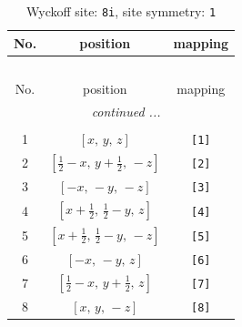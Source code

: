 \documentclass[fleqn,8pt]{jsarticle}
\begin{document}
\renewcommand{\arraystretch}{1.2}
\begin{longtable}{ccc}
\caption{Wyckoff site: {\tt 8i}, site symmetry: {\tt 1}}
 \\
 \hline \hline
No. & position & mapping \\ \hline \endfirsthead

\multicolumn{2}{l}{\tablename\ \thetable{}} \\
 \hline \hline
No. & position & mapping \\ \hline \endhead

 \hline \hline
\multicolumn{2}{r}{\footnotesize\it continued ...} \\ \endfoot

 \hline \hline
\multicolumn{2}{r}{} \\ \endlastfoot

1 & $\left[ x,\, y,\, z \right]$ & {\tt [1]} \\ \hline
2 & $\left[ \frac{1}{2} - x,\, y + \frac{1}{2},\, - z \right]$ & {\tt [2]} \\ \hline
3 & $\left[ - x,\, - y,\, - z \right]$ & {\tt [3]} \\ \hline
4 & $\left[ x + \frac{1}{2},\, \frac{1}{2} - y,\, z \right]$ & {\tt [4]} \\ \hline
5 & $\left[ x + \frac{1}{2},\, \frac{1}{2} - y,\, - z \right]$ & {\tt [5]} \\ \hline
6 & $\left[ - x,\, - y,\, z \right]$ & {\tt [6]} \\ \hline
7 & $\left[ \frac{1}{2} - x,\, y + \frac{1}{2},\, z \right]$ & {\tt [7]} \\ \hline
8 & $\left[ x,\, y,\, - z \right]$ & {\tt [8]} \\
\end{longtable}
\end{document}
